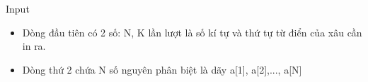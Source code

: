 Input  
\begin{itemize}
	\item     Dòng đầu tiên có 2 số: N, K lần lượt là số kí tự và thứ tự từ điển của xâu cần in ra.   
	\item     Dòng thứ 2 chứa N số nguyên phân biệt là dãy a[1], a[2],..., a[N]   
\end{itemize}
